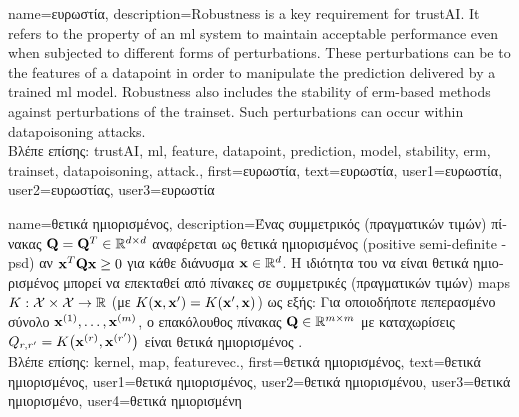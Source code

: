 {name={\foreignlanguage{greek}{ευρωστία}},
	description={Robustness is a key requirement for \gls{trustAI}. It
		refers to the property of an \gls{ml} system to maintain acceptable performance even when 
		subjected to different forms of perturbations. These perturbations can be to the \gls{feature}s 
		of a \gls{datapoint} in order to manipulate the \gls{prediction} delivered by a trained \gls{ml} \gls{model}. 
		Robustness also includes the \gls{stability} of \gls{erm}-based methods against perturbations 
		of the \gls{trainset}. Such perturbations can occur within \gls{datapoisoning} \gls{attack}s. \\
		\foreignlanguage{greek}{Βλέπε επίσης:} \gls{trustAI}, \gls{ml}, \gls{feature}, \gls{datapoint}, \gls{prediction}, 
		\gls{model}, \gls{stability}, \gls{erm}, \gls{trainset}, \gls{datapoisoning}, \gls{attack}.}, 
	first={\foreignlanguage{greek}{ευρωστία}}, 
	text={\foreignlanguage{greek}{ευρωστία}},
	user1={\foreignlanguage{greek}{ευρωστία}}, %
  	user2={\foreignlanguage{greek}{ευρωστίας}}, %
	user3={\foreignlanguage{greek}{ευρωστία}} %
}

{name={\foreignlanguage{greek}{θετικά ημιορισμένος}},
	description={\foreignlanguage{greek}{Ένας συμμετρικός (πραγματικών τιμών) πίνακας}\linebreak 
		$\mathbf{Q} = \mathbf{Q}^{T} \in \mathbb{R}^{d \times d}$ 
	 	\foreignlanguage{greek}{αναφέρεται ως θετικά ημιορισμένος} (positive semi-definite - psd) 
		\foreignlanguage{greek}{αν ${\bf x}^{T} \mathbf{Q} {\bf x} \geq 0$ για κάθε διάνυσμα ${\bf x} \in \mathbb{R}^{d}$. 
	 	Η ιδιότητα του να είναι θετικά ημιορισμένος μπορεί να επεκταθεί από πίνακες σε συμμετρικές (πραγματικών τιμών)} \gls{map}s   
	 	 $K: \mathcal{X} \times \mathcal{X} \rightarrow \mathbb{R}$ 
	 	(\foreignlanguage{greek}{με $K({\bf x},{\bf x}') = K({\bf x}',{\bf x})$)
	 	ως εξής: Για οποιοδήποτε πεπερασμένο σύνολο}  ${\bf x}^{(1)}, \ldots, {\bf x}^{(m)}$, 
	 	\foreignlanguage{greek}{ο επακόλουθος πίνακας $\mathbf{Q} \in \mathbb{R}^{m \times m}$ με καταχωρίσεις 
		$Q_{r,r'} = K\big({\bf x}^{(r)},{\bf x}^{(r')}\big)$ 
		είναι θετικά ημιορισμένος} \cite{LearningKernelsBook}.\\
		\foreignlanguage{greek}{Βλέπε επίσης:} \gls{kernel}, \gls{map}, \gls{featurevec}.},
	first={\foreignlanguage{greek}{θετικά ημιορισμένος}},
	text={\foreignlanguage{greek}{θετικά ημιορισμένος}},
	user1={\foreignlanguage{greek}{θετικά ημιορισμένος}}, %
  	user2={\foreignlanguage{greek}{θετικά ημιορισμένου}}, %
	user3={\foreignlanguage{greek}{θετικά ημιορισμένο}}, %
	user4={\foreignlanguage{greek}{θετικά ημιορισμένη}} %
}

